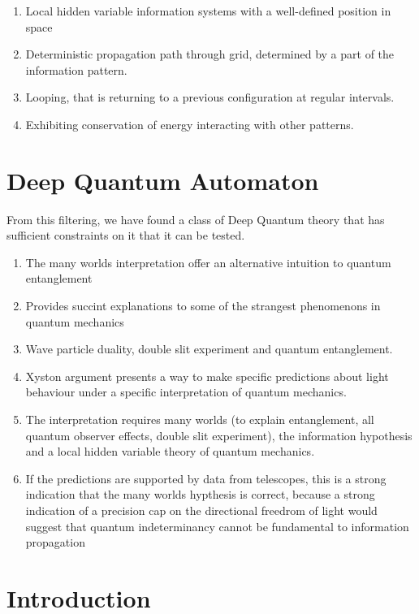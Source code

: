 \documentclass[notitlepage]{report}
\begin{document}
\begin{enumerate}
\item Local hidden variable information systems with a well-defined position in space 
\item Deterministic propagation path through grid, determined by a part of the information pattern.
\item Looping, that is returning to a previous configuration at regular intervals.
\item Exhibiting conservation of energy interacting with other patterns.
\end{enumerate}

\section*{Deep Quantum Automaton }
From this filtering, we have found a class of Deep Quantum theory that has sufficient constraints on it that it can be tested.

\begin{enumerate}
	\item  The many worlds interpretation offer an alternative intuition to quantum entanglement
	\item  Provides succint explanations to some of the strangest phenomenons in quantum mechanics
	\item  Wave particle duality, double slit experiment and quantum entanglement.
	\item  Xyston argument presents a way to make specific predictions about light behaviour under a specific interpretation of quantum mechanics.
	\item The interpretation requires many worlds (to explain entanglement, all quantum observer effects, double slit experiment), the information hypothesis and a local hidden variable theory of quantum mechanics.
	\item If the predictions are supported by data from telescopes, this is a strong indication that the many worlds hypthesis is correct, because a strong indication of a precision cap on the directional freedrom of light would suggest that quantum indeterminancy cannot be fundamental to information propagation

\end{enumerate}
\section*{Introduction}
\end{document}
